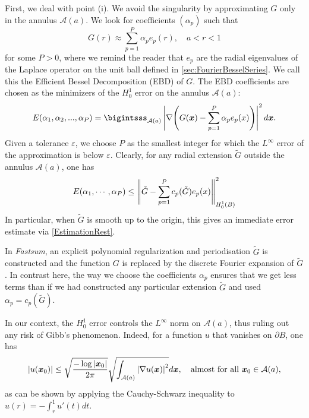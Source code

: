\documentclass[main]{subfiles}
\begin{document}
First, we deal with point (i). We avoid the singularity by approximating $G$ only in the annulus $\mathcal{A}(a)$. We look for coefficients $(\alpha_p)$ such that
\begin{equation}
G(r) \approx \sum_{p = 1}^P \alpha_p e_p(r), \quad  a< r < 1
\label{temp2}
\end{equation}
for some $P>0$, where we remind the reader that $e_p$ are the radial eigenvalues of the Laplace operator on the unit ball defined in \autoref{sec:FourierBesselSeries}. We call this the Efficient Bessel Decomposition (EBD) of $G$. The EBD coefficients are chosen as the minimizers of the $H^1_0$ error on the annulus $\mathcal{A}(a)$:
\[ E(\alpha_1,\alpha_2,...,\alpha_P) = \bigintsss_{\mathcal{A}(a)} \left|\nabla \!\left( G(\bs{x}) - \sum_{p=1}^P \alpha_p e_p(x)\right)\right|^2d\bs{x}.\] 
Given a tolerance $\varepsilon$, we choose $P$ as the smallest integer for which the $L^\infty$ error of the approximation is below $\varepsilon$. Clearly, for any radial extension $\tilde{G}$ outside the annulus $\mathcal{A}(a)$, one has 
\begin{equation}
E(\alpha_1,\cdots,\alpha_P) \leq \left\|\tilde{G} - \sum_{p = 1}^P c_p(\tilde{G})e_p(x)\right\|^2_{H^1_0(B)}
\label{estimParProlongement}
\end{equation}
In particular, when $\tilde{G}$ is smooth up to the origin, this gives an immediate error estimate via \autoref{EstimationRest}. 
\begin{remark}
	\label{RemarkPotts}
	In \textit{Fastsum}, an explicit polynomial regularization and periodisation $\tilde{G}$ is constructed and the function $G$ is replaced by the discrete Fourier expansion of $\tilde{G}$. In contrast here, the way we choose the coefficients $\alpha_p$ ensures that we get less terms than if we had constructed any particular extension $\tilde{G}$ and used $\alpha_p = c_p(\tilde{G})$. 
\end{remark}
\begin{remark}
	\label{RemLinf}
	In our context, the $H_0^1$ error controls the $L^{\infty}$ norm on $\mathcal{A}(a)$, thus ruling out any risk of Gibb's phenomenon. Indeed, for a function $u$ that vanishes on $\partial B$, one has
	\[\left\lvert u(\boldsymbol{x}_0) \right\rvert \leq \sqrt{\dfrac{-\log \left\lvert \boldsymbol{x}_0 \right\rvert}{2\pi}}\sqrt{\int_{\mathcal{A}(a)} \left\lvert \nabla u(\boldsymbol{x}) \right\rvert^2} d\boldsymbol{x},\quad  \text{almost for all }\boldsymbol{x}_0 \in \mathcal{A}(a),\]
	as can be shown by applying the Cauchy-Schwarz inequality to $u(r) = -\int_{r}^{1} u'(t)dt.$
\end{remark}	
\end{document}
